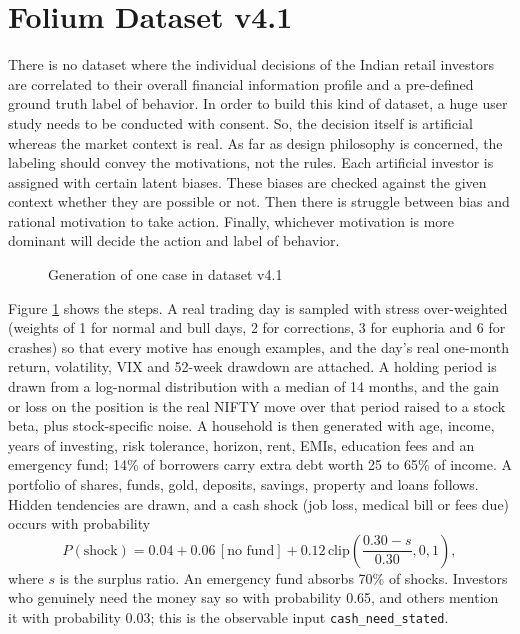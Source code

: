 \section{Folium Dataset v4.1}
There is no dataset where the individual decisions of the Indian retail investors are correlated to their overall financial information profile and a pre-defined ground truth label of behavior. In order to build this kind of dataset, a huge user study needs to be conducted with consent. So, the decision itself is artificial whereas the market context is real. As far as design philosophy is concerned, the labeling should convey the motivations, not the rules. Each artificial investor is assigned with certain latent biases. These biases are checked against the given context whether they are possible or not. Then there is struggle between bias and rational motivation to take action. Finally, whichever motivation is more dominant will decide the action and label of behavior.

\begin{figure}[H]
\centering
\resizebox{\textwidth}{!}{}
\caption{Generation of one case in dataset v4.1}
\label{fig:datasetgen}
\end{figure}

Figure \ref{fig:datasetgen} shows the steps. A real trading day is sampled with stress over-weighted (weights of 1 for normal and bull days, 2 for corrections, 3 for euphoria and 6 for crashes) so that every motive has enough examples, and the day's real one-month return, volatility, VIX and 52-week drawdown are attached. A holding period is drawn from a log-normal distribution with a median of 14 months, and the gain or loss on the position is the real NIFTY move over that period raised to a stock beta, plus stock-specific noise. A household is then generated with age, income, years of investing, risk tolerance, horizon, rent, EMIs, education fees and an emergency fund; 14\% of borrowers carry extra debt worth 25 to 65\% of income. A portfolio of shares, funds, gold, deposits, savings, property and loans follows. Hidden tendencies are drawn, and a cash shock (job loss, medical bill or fees due) occurs with probability
\begin{equation}
P(\text{shock}) = 0.04 + 0.06\,[\text{no fund}] + 0.12\,\mathrm{clip}\!\left(\frac{0.30 - s}{0.30}, 0, 1\right),
\end{equation}
where $s$ is the surplus ratio. An emergency fund absorbs 70\% of shocks. Investors who genuinely need the money say so with probability 0.65, and others mention it with probability 0.03; this is the observable input \texttt{cash\_need\_stated}.

